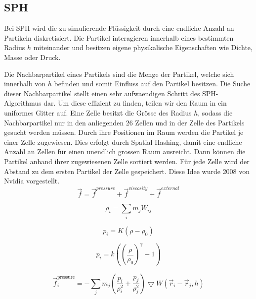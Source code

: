 \documentclass[a4paper]{paper}
\begin{document}
\subsection{SPH}

Bei SPH wird die zu simulierende Flüssigkeit durch eine endliche Anzahl an Partikeln diskretisiert. Die Partikel interagieren innerhalb eines bestimmten Radius $h$ miteinander und besitzen eigene physikalische Eigenschaften wie  Dichte, Masse oder Druck.

Die Nachbarpartikel eines Partikels sind die Menge der Partikel, welche sich innerhalb von $h$ befinden und somit Einfluss auf den Partikel besitzen. Die Suche dieser Nachbarpartikel stellt einen sehr aufwaendigen Schritt des SPH-Algorithmus dar. Um diese effizient zu finden, teilen wir den Raum in ein uniformes Gitter auf. Eine Zelle besitzt die Grösse des Radius $h$, sodass die Nachbarpartikel nur in den anliegenden 26 Zellen und in der Zelle des Partikels gesucht werden müssen. Durch ihre Positionen im Raum werden die Partikel je einer Zelle zugewiesen. Dies erfolgt durch Spatial Hashing, damit eine endliche Anzahl an Zellen für einen unendlich grossen Raum ausreicht. Dann können die Partikel anhand ihrer zugewiesenen Zelle sortiert werden. Für jede Zelle wird der Abstand zu dem ersten Partikel der Zelle gespeichert. Diese Idee wurde 2008 von Nvidia vorgestellt. \citep{Nvidia}
\begin{equation}
\label{force}
\vec{f} = \vec{f}^{pressure} + \vec{f}^{viscosity} + \vec{f}^{external}
\end{equation}


\begin{equation}
\label{density}
\rho_i = \sum_i{m_j W_{ij}}
\end{equation}



\begin{equation}
\label{pressure}
p_i=K(\rho-\rho_0)
\end{equation}

\begin{equation}
\label{pressure_tait}
p_i = k((\frac{\rho}{\rho_{0}})^{\gamma}-1)
\end{equation}

\begin{equation}
\label{force_pressure}
\vec{f}^{\text{pressure}}_{i} = - \sum_{j}m_{j}(\frac{p_{i}}{\rho_{i}^2} +\frac{p_{j}}{\rho_{j}^2})\bigtriangledown W(\vec{r}_{i}-\vec{r}_{j},h)
\end{equation}
\end{document}
